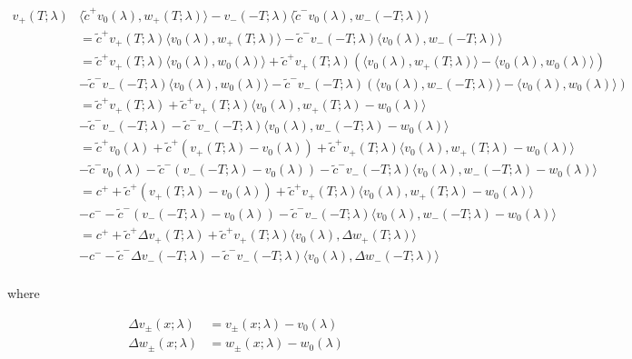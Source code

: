 \documentclass[12pt]{article}
\begin{document}
\begin{enumerate}
\begin{align*}
v_+(T; \lambda) &\langle \tilde{c}^+ v_0(\lambda), w_+(T; \lambda) \rangle - v_-(-T; \lambda) \langle \tilde{c}^- v_0(\lambda), w_-(-T; \lambda) \rangle \\
&= \tilde{c}^+ v_+(T; \lambda)\langle v_0(\lambda), w_+(T; \lambda) \rangle - \tilde{c}^- v_-(-T; \lambda) \langle  v_0(\lambda), w_-(-T; \lambda) \rangle \\
&= \tilde{c}^+ v_+(T; \lambda)\langle v_0(\lambda), w_0(\lambda) \rangle + \tilde{c}^+ v_+(T; \lambda)( \langle v_0(\lambda), w_+(T; \lambda) \rangle - \langle v_0(\lambda), w_0(\lambda) \rangle )\\
&- \tilde{c}^- v_-(-T; \lambda)\langle v_0(\lambda), w_0(\lambda) \rangle - \tilde{c}^- v_-(-T; \lambda)( \langle v_0(\lambda), w_-(-T; \lambda) \rangle - \langle v_0(\lambda), w_0(\lambda) \rangle )\\
&= \tilde{c}^+ v_+(T; \lambda) + \tilde{c}^+ v_+(T; \lambda) \langle v_0(\lambda), w_+(T; \lambda) - w_0(\lambda) \rangle \\
&- \tilde{c}^- v_-(-T; \lambda) - \tilde{c}^- v_-(-T; \lambda) \langle v_0(\lambda), w_-(-T; \lambda) - w_0(\lambda) \rangle \\
&= \tilde{c}^+ v_0(\lambda) + \tilde{c}^+( v_+(T; \lambda) - v_0(\lambda)) + \tilde{c}^+ v_+(T; \lambda) \langle v_0(\lambda), w_+(T; \lambda) - w_0(\lambda) \rangle \\
&- \tilde{c}^- v_0(\lambda) - \tilde{c}^-( v_-(-T; \lambda) - v_0(\lambda)) - \tilde{c}^- v_-(-T; \lambda) \langle v_0(\lambda), w_-(-T; \lambda) - w_0(\lambda) \rangle \\
&= c^+ + \tilde{c}^+( v_+(T; \lambda) - v_0(\lambda)) + \tilde{c}^+ v_+(T; \lambda) \langle v_0(\lambda), w_+(T; \lambda) - w_0(\lambda) \rangle \\
&- c^- - \tilde{c}^-( v_-(-T; \lambda) - v_0(\lambda)) - \tilde{c}^- v_-(-T; \lambda) \langle v_0(\lambda), w_-(-T; \lambda) - w_0(\lambda) \rangle \\
&= c^+ + \tilde{c}^+ \Delta v_+(T; \lambda) + \tilde{c}^+ v_+(T; \lambda) \langle v_0(\lambda), \Delta w_+(T; \lambda) \rangle \\
&- c^- - \tilde{c}^- \Delta v_-(-T; \lambda) - \tilde{c}^- v_-(-T; \lambda) \langle v_0(\lambda), \Delta w_-(-T; \lambda) \rangle \\
\end{align*}

where 

\begin{align*}
\Delta v_\pm(x; \lambda) &= v_\pm(x; \lambda) - v_0(\lambda) \\
\Delta w_\pm(x; \lambda) &= w_\pm(x; \lambda) - w_0(\lambda)
\end{align*}


\end{enumerate}
\end{document}
